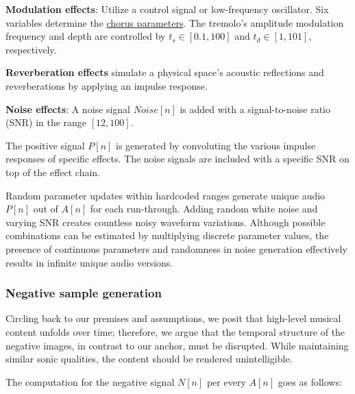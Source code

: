\textbf{Modulation effects}: Utilize a control signal or low-frequency oscillator. Six variables determine the \href{https://github.com/oriolcolomefont/Master-Thesis/blob/main/dataset.py}{chorus parameters}. The tremolo's amplitude modulation frequency and depth are controlled by $t_s \in [0.1, 100]$ and $t_d \in [1, 101]$, respectively. 

\textbf{Reverberation effects} simulate a physical space's acoustic reflections and reverberations by applying an impulse response.

\textbf{Noise effects}: A noise signal $Noise[n]$ is added with a signal-to-noise ratio (SNR) in the range $[12, 100]$. 

The positive signal $P[n]$ is generated by convoluting the various impulse responses of specific effects. The noise signals are included with a specific SNR on top of the effect chain.

Random parameter updates within hardcoded ranges generate unique audio $P[n]$ out of $A[n]$ for each run-through. Adding random white noise and varying SNR creates countless noisy waveform variations. Although possible combinations can be estimated by multiplying discrete parameter values, the presence of continuous parameters and randomness in noise generation effectively results in infinite unique audio versions.

\subsubsection{Negative sample generation}

Circling back to our premises and assumptions, we posit that high-level musical content unfolds over time; therefore, we argue that the temporal structure of the negative images, in contrast to our anchor, must be disrupted. While maintaining similar sonic qualities, the content should be rendered unintelligible.

The computation for the negative signal $N[n]$ per every $A[n]$ goes as follows:

